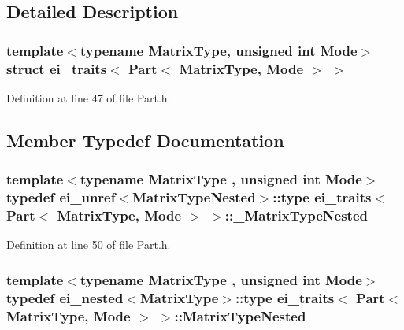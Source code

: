 \subsection{Detailed Description}
\subsubsection*{template$<$typename Matrix\-Type, unsigned int Mode$>$struct ei\-\_\-traits$<$ Part$<$ Matrix\-Type, Mode $>$ $>$}



Definition at line 47 of file Part.\-h.



\subsection{Member Typedef Documentation}
\hypertarget{structei__traits_3_01_part_3_01_matrix_type_00_01_mode_01_4_01_4_abf53a489501dc62cc03ece77757ad982}{
\subsubsection[{\-\_\-\-Matrix\-Type\-Nested}]{\setlength{\rightskip}{0pt plus 5cm}template$<$typename Matrix\-Type , unsigned int Mode$>$ typedef {\bf ei\-\_\-unref}$<${\bf Matrix\-Type\-Nested}$>$\-::{\bf type} {\bf ei\-\_\-traits}$<$ {\bf Part}$<$ Matrix\-Type, Mode $>$ $>$\-::{\bf \-\_\-\-Matrix\-Type\-Nested}}}\label{structei__traits_3_01_part_3_01_matrix_type_00_01_mode_01_4_01_4_abf53a489501dc62cc03ece77757ad982}


Definition at line 50 of file Part.\-h.

\hypertarget{structei__traits_3_01_part_3_01_matrix_type_00_01_mode_01_4_01_4_ac493b4d95824c6a2fa7291bc93745b4b}{
\subsubsection[{Matrix\-Type\-Nested}]{\setlength{\rightskip}{0pt plus 5cm}template$<$typename Matrix\-Type , unsigned int Mode$>$ typedef {\bf ei\-\_\-nested}$<$Matrix\-Type$>$\-::{\bf type} {\bf ei\-\_\-traits}$<$ {\bf Part}$<$ Matrix\-Type, Mode $>$ $>$\-::{\bf Matrix\-Type\-Nested}}}\label{structei__traits_3_01_part_3_01_matrix_type_00_01_mode_01_4_01_4_ac493b4d95824c6a2fa7291bc93745b4b}


